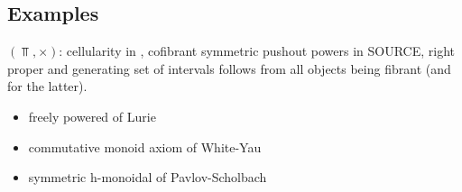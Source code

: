 \documentclass[a4paper,10pt
,draft
]{article}%
\renewcommand{\1}{\ensuremath{\mathbb{id}}}
\begin{document}
\subsection{Examples}





\begin{example}
      $(\Top,\times)$:
      cellularity in \cite{Pia91},
      cofibrant symmetric pushout powers in {\color{red} SOURCE},
      right proper and generating set of intervals follows from all objects being fibrant (and \cite[Lemma 2.1]{BM13} for the latter).
\end{example}

\begin{itemize}
\item freely powered of Lurie
\item commutative monoid axiom of White-Yau
\item symmetric h-monoidal of Pavlov-Scholbach
\end{itemize}




\end{document}
